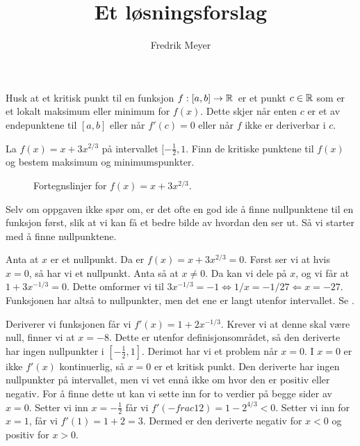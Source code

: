 \documentclass[11pt, norsk]{article}
\begin{document}
\title{Et løsningsforslag}
\author{Fredrik Meyer}
\maketitle

Husk at et kritisk punkt til en funksjon $f:[a,b] \to \mathbb{R}$ er et punkt $c \in \mathbb{R}$ som er et lokalt maksimum eller minimum for $f(x)$. Dette skjer når enten $c$ er et av endepunktene til $[a,b]$ eller når $f'(c)=0$ eller når $f$ ikke er deriverbar i $c$.

\begin{oppg}[Oppgave 6.4.1e]
La $f(x) = x+3x^{2/3}$ på intervallet $[-\frac 12, 1$. Finn de kritiske punktene til $f(x)$ og bestem maksimum og minimumspunkter.
\end{oppg}
\begin{losn}
\begin{figure}
\centering
{}
\caption{Fortegnslinjer for $f(x)=x+3x^{2/3}$.}
\label{fig:flinje}
\end{figure}
 

Selv om oppgaven ikke spør om, er det ofte en god ide å finne nullpunktene til en funksjon først, slik at vi kan få et bedre bilde av hvordan den ser ut. Så vi starter med å finne nullpunktene.

Anta at $x$ er et nullpunkt. Da er $f(x)=x+3x^{2/3}=0$. Først ser vi at hvis $x=0$, så har vi et nullpunkt. Anta så at $x \neq 0$. Da kan vi dele på $x$, og vi får at $1+3x^{-1/3}=0$. Dette omformer vi til $3x^{-1/3}=-1 \Leftrightarrow 1/x = -1/27 \Leftarrow x=-27$. Funksjonen har altså to nullpunkter, men det ene er langt utenfor intervallet. Se .

Deriverer vi funksjonen får vi $f'(x) = 1+2x^{-1/3}$. Krever vi at denne skal være null, finner vi at $x=-8$. Dette er utenfor definisjonsområdet, så den deriverte har ingen nullpunkter i $[-\frac 12,1]$. Derimot har vi et problem når $x=0$. I $x=0$ er ikke $f'(x)$ kontinuerlig, så $x=0$ er et kritisk punkt. Den deriverte har ingen nullpunkter på intervallet, men vi vet ennå ikke om hvor den er positiv eller negativ. For å finne dette ut kan vi sette inn for to verdier på begge sider av $x=0$. Setter vi inn $x=-\frac 12$ får vi $f'(-frac 12)=1-2^{4/3} < 0$. Setter vi inn for $x=1$, får vi $f'(1)=1+2=3$. Dermed er den deriverte negativ for $x < 0$ og positiv for $x > 0$. 


\end{losn}
\end{document}
